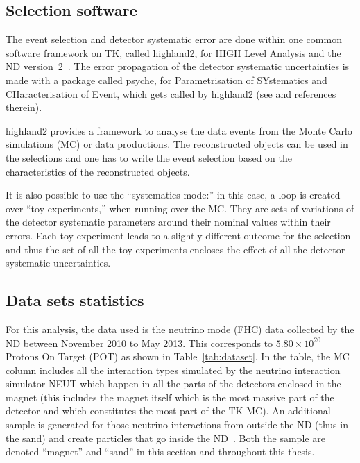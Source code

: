 \subsection{Selection software}
\label{subsec:selecsoft}

The event selection and detector systematic error are done within one
common software framework on \Gls{TK}, called \gls{highland2}, for
HIGH Level Analysis and the \Gls{ND}
version~2~\cite{nd280highland}. The error propagation of the detector
systematic uncertainties is made with a package called \Gls{psyche},
for Parametrisation of SYstematics and CHaracterisation of Event,
which gets called by \gls{highland2} (see \cite{nd280highland} and
references therein).

\Gls{highland2} provides a framework to analyse the data events from
the Monte Carlo simulations (\Gls{MC}) or data productions. The
reconstructed objects can be used in the selections and one has to
write the event selection based on the characteristics of the
reconstructed objects.

It is also possible to use the ``systematics mode:'' in this case, a
loop is created over ``toy experiments,'' when running over the
\Gls{MC}. They are sets of variations of the detector systematic
parameters around their nominal values within their errors. Each toy
experiment leads to a slightly different outcome for the selection and
thus the set of all the toy experiments encloses the effect of all the
detector systematic uncertainties.

\subsection{Data sets statistics}
\label{subsec:datasets}
For this analysis, the data used is the neutrino mode (\Gls{FHC}) data
collected by the \Gls{ND} between November 2010 to May 2013. This
corresponds to $5.80\times 10^{20}$ Protons On Target (\Gls{POT}) as
shown in Table~\ref{tab:dataset}. In the table, the \Gls{MC} column
includes all the interaction types simulated by the neutrino
interaction simulator \Gls{NEUT} which happen in all the parts of the
detectors enclosed in the \Gls{magnet} (this includes the magnet
itself which is the most massive part of the detector and which
constitutes the most part of the \Gls{TK} \Gls{MC}). An additional
sample is generated for those neutrino interactions from outside the
\Gls{ND} (thus in the sand) and create particles that go inside the
\Gls{ND}~\cite{TN077}. Both the sample are denoted ``\gls{magnet}''
and ``\gls{sand}'' in this section and throughout this thesis.


